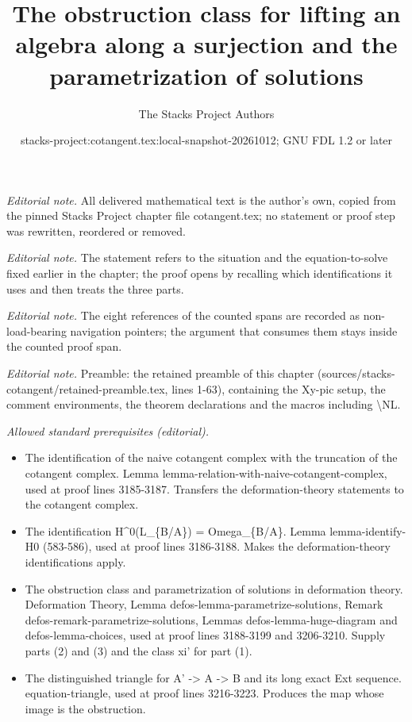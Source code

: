 \documentclass[10pt,a4paper]{amsart}
\title{The obstruction class for lifting an algebra along a surjection and the parametrization of solutions}
\author{The Stacks Project Authors}
\date{stacks-project:cotangent.tex:local-snapshot-20261012; GNU FDL 1.2 or later}
\theoremstyle{plain}
\theoremstyle{definition}
\theoremstyle{remark}
\numberwithin{equation}{subsection}
\begin{document}
\maketitle
\setcounter{subsection}{1}
\noindent\textit{Editorial note.} All delivered mathematical text is the author's own, copied from the pinned Stacks Project chapter file cotangent.tex; no statement or proof step was rewritten, reordered or removed.\par\medskip
\noindent\textit{Editorial note.} The statement refers to the situation and the equation-to-solve fixed earlier in the chapter; the proof opens by recalling which identifications it uses and then treats the three parts.\par\medskip
\noindent\textit{Editorial note.} The eight references of the counted spans are recorded as non-load-bearing navigation pointers; the argument that consumes them stays inside the counted proof span.\par\medskip
\noindent\textit{Editorial note.} Preamble: the retained preamble of this chapter (sources/stacks-cotangent/retained-preamble.tex, lines 1-63), containing the Xy-pic setup, the comment environments, the theorem declarations and the macros including \textbackslash{}NL.\par\medskip
\noindent\textit{Allowed standard prerequisites (editorial).}\begin{itemize}
\item The identification of the naive cotangent complex with the truncation of the cotangent complex. Lemma lemma-relation-with-naive-cotangent-complex, used at proof lines 3185-3187. Transfers the deformation-theory statements to the cotangent complex.
\item The identification H\textasciicircum{}0(L\_\{B/A\}) = Omega\_\{B/A\}. Lemma lemma-identify-H0 (583-586), used at proof lines 3186-3188. Makes the deformation-theory identifications apply.
\item The obstruction class and parametrization of solutions in deformation theory. Deformation Theory, Lemma defos-lemma-parametrize-solutions, Remark defos-remark-parametrize-solutions, Lemmas defos-lemma-huge-diagram and defos-lemma-choices, used at proof lines 3188-3199 and 3206-3210. Supply parts (2) and (3) and the class xi' for part (1).
\item The distinguished triangle for A' -> A -> B and its long exact Ext sequence. equation-triangle, used at proof lines 3216-3223. Produces the map whose image is the obstruction.
\end{itemize}\medskip
\end{document}
